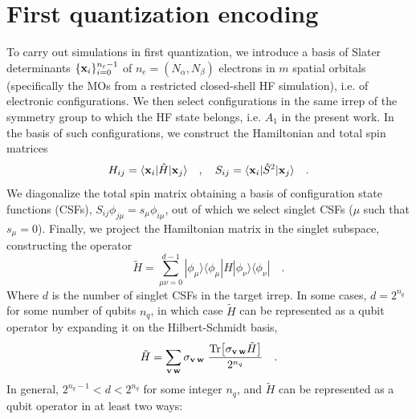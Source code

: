 \documentclass[aps,pra,onecolumn]{revtex4-2}
\newcommand{\vett}[1]{{\bf{#1}}}
\begin{document}
\section{First quantization encoding}
\label{sec:first}

To carry out simulations in first quantization, we introduce a basis of Slater determinants $\{ {\bf{x}}_i \}_{i=0}^{n_c-1}$ of $n_e=(N_\alpha,N_\beta)$ electrons in $m$ spatial orbitals
(specifically the MOs from a restricted closed-shell HF simulation), i.e. of electronic configurations. 
We then select configurations in the same irrep of the symmetry group to which the HF state belongs, i.e. $A_1$ in the present work.
In the basis of such configurations, we construct the Hamiltonian and total spin matrices
\begin{equation}
H_{ij} = \langle {\bf{x}}_i | \hat{H} | {\bf{x}}_j \rangle
\quad,\quad
S_{ij} = \langle {\bf{x}}_i | \hat{S}^2 | {\bf{x}}_j \rangle
\quad.
\end{equation}
We diagonalize the total spin matrix obtaining a basis of configuration state functions (CSFs), $S_{ij} \phi_{j\mu} = s_\mu \phi_{i\mu}$, out of which we select singlet CSFs 
($\mu$ such that $s_\mu=0$). Finally, we project the Hamiltonian matrix in the singlet subspace, constructing the operator
\begin{equation}
\tilde{H} = \sum_{\mu\nu=0}^{d-1} | \phi_\mu \rangle \langle \phi_\mu | \hat{H} | \phi_\nu \rangle \langle \phi_\nu |
\quad.
\end{equation}
Where $d$ is the number of singlet CSFs in the target irrep. In some cases, $d=2^{n_q}$ for some number of qubits $n_q$, in which case $\tilde{H}$ can be represented as a qubit
operator by expanding it on the Hilbert-Schmidt basis,
\begin{equation}
\tilde{H} = \sum_{\vett{v} \, \vett{w}} \sigma_{\vett{v} \, \vett{w}} \; \frac{ \mbox{Tr}\big[ \sigma_{\vett{v} \, \vett{w}} \tilde{H} \big] }{2^{n_q} } \quad.
\end{equation}
In general, $2^{n_q-1} < d < 2^{n_q}$ for some integer $n_q$, and $\tilde{H}$ can be represented as a qubit operator in at least two ways:
\end{document}
